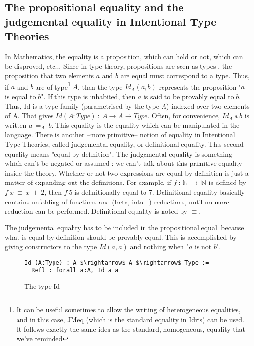 \subsection{The propositional equality and the judgemental equality in Intentional Type Theories}
In Mathematics, the equality is a proposition, which can hold or not, which can be disproved, etc...
Since in type theory, propositions are seen as types \cite{How80}, the proposition that two elements $a$ and $b$ are equal must correspond to a type. Thus, if $a$ and $b$ are of type\footnote{It can be useful sometimes to allow the writing of heterogeneous equalities, and in this case, JMeq (which is the standard equality in Idris) can be used. It follows exactly the same idea as the standard, homogeneous, equality that we've reminded} $A$, then the type $Id_A(a, b)$ represents the proposition "$a$ is equal to $b$". If this type is inhabited, then $a$ is said to be provably equal to $b$.
Thus, Id is a type family (parametrised by the type $A$) indexed over two elements of A. That gives $Id (A:Type)\ :\ A \rightarrow A \rightarrow Type$. Often, for convenience, $Id_A\ a\ b$ is written $a\ =_A\ b$.
This equality is the equality which can be manipulated in the language. There is another --more primitive-- notion of equality in Intentional Type Theories, called judgemental equality, or definitional equality. This second equality means "equal by definition". The judgemental equality is something which can't be negated or assumed : we can't talk about this primitive equality inside the theory. Whether or not two expressions are equal by definition is just a matter of expanding out the definitions. For example, if $f\ :\ \mathbb{N}\ \rightarrow\ \mathbb{N}$ is defined by $f\ x\ \equiv\ x\ +\ 2$, then $f\ 5$ is definitionally equal to $7$. Definitional equality basically contains unfolding of functions and (beta, iota...) reductions, until no more reduction can be performed.
Definitional equality is noted by $\equiv$.

The judgemental equality has to be included in the propositional equal, because what is equal by definition should be provably equal.
This is accomplished by giving constructors to the type $Id(a,a)$ and nothing when "$a$ is not $b$".
\begin{figure}[H]
\figrule
\begin{center}
\begin{lstlisting}
Id (A:Type) : A $\rightarrow$ A $\rightarrow$ Type :=
  Refl : forall a:A, Id a a
\end{lstlisting}
\end{center}
\caption{The type Id}
\figrule
\end{figure}

